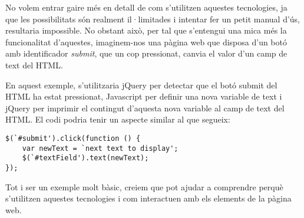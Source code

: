     No volem entrar gaire més en detall de com s’utilitzen aquestes tecnologies, ja que les possibilitats són realment il·limitades i intentar fer un petit manual d’ús, resultaria impossible. No obstant això, per tal que s'entengui una mica més la funcionalitat d'aquestes, imaginem-nos una pàgina web que disposa d'un botó amb identificador \emph{submit}, que un cop pressionat, canvia el valor d'un camp de text del HTML.

    En aquest exemple, s'utilitzaria jQuery per detectar que el botó submit del HTML ha estat pressionat, Javascript per definir una nova variable de text i jQuery per imprimir el contingut d’aquesta nova variable al camp de text del HTML. El codi podria tenir un aspecte similar al que segueix:

\begin{lstlisting}[style=rawOwn,caption={Example of jQuery and Javascript}]
$(`#submit').click(function () {
	var newText = `next text to display';
	$(`#textField').text(newText);
});
\end{lstlisting}

    Tot i ser un exemple molt bàsic, creiem que pot ajudar a comprendre perquè s'utilitzen aquestes tecnologies i com interactuen amb els elements de la pàgina web.
